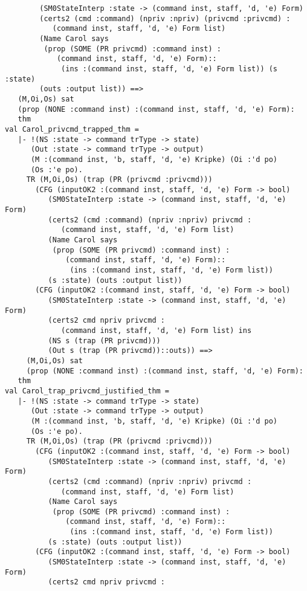 \documentclass{report}
\begin{document}
\begin{session}
\begin{scriptsize}
\begin{verbatim}
        (SM0StateInterp :state -> (command inst, staff, 'd, 'e) Form)
        (certs2 (cmd :command) (npriv :npriv) (privcmd :privcmd) :
           (command inst, staff, 'd, 'e) Form list)
        (Name Carol says
         (prop (SOME (PR privcmd) :command inst) :
            (command inst, staff, 'd, 'e) Form)::
             (ins :(command inst, staff, 'd, 'e) Form list)) (s :state)
        (outs :output list)) ==>
   (M,Oi,Os) sat
   (prop (NONE :command inst) :(command inst, staff, 'd, 'e) Form):
   thm
val Carol_privcmd_trapped_thm =
   |- !(NS :state -> command trType -> state)
      (Out :state -> command trType -> output)
      (M :(command inst, 'b, staff, 'd, 'e) Kripke) (Oi :'d po)
      (Os :'e po).
     TR (M,Oi,Os) (trap (PR (privcmd :privcmd)))
       (CFG (inputOK2 :(command inst, staff, 'd, 'e) Form -> bool)
          (SM0StateInterp :state -> (command inst, staff, 'd, 'e) Form)
          (certs2 (cmd :command) (npriv :npriv) privcmd :
             (command inst, staff, 'd, 'e) Form list)
          (Name Carol says
           (prop (SOME (PR privcmd) :command inst) :
              (command inst, staff, 'd, 'e) Form)::
               (ins :(command inst, staff, 'd, 'e) Form list))
          (s :state) (outs :output list))
       (CFG (inputOK2 :(command inst, staff, 'd, 'e) Form -> bool)
          (SM0StateInterp :state -> (command inst, staff, 'd, 'e) Form)
          (certs2 cmd npriv privcmd :
             (command inst, staff, 'd, 'e) Form list) ins
          (NS s (trap (PR privcmd)))
          (Out s (trap (PR privcmd))::outs)) ==>
     (M,Oi,Os) sat
     (prop (NONE :command inst) :(command inst, staff, 'd, 'e) Form):
   thm
val Carol_trap_privcmd_justified_thm =
   |- !(NS :state -> command trType -> state)
      (Out :state -> command trType -> output)
      (M :(command inst, 'b, staff, 'd, 'e) Kripke) (Oi :'d po)
      (Os :'e po).
     TR (M,Oi,Os) (trap (PR (privcmd :privcmd)))
       (CFG (inputOK2 :(command inst, staff, 'd, 'e) Form -> bool)
          (SM0StateInterp :state -> (command inst, staff, 'd, 'e) Form)
          (certs2 (cmd :command) (npriv :npriv) privcmd :
             (command inst, staff, 'd, 'e) Form list)
          (Name Carol says
           (prop (SOME (PR privcmd) :command inst) :
              (command inst, staff, 'd, 'e) Form)::
               (ins :(command inst, staff, 'd, 'e) Form list))
          (s :state) (outs :output list))
       (CFG (inputOK2 :(command inst, staff, 'd, 'e) Form -> bool)
          (SM0StateInterp :state -> (command inst, staff, 'd, 'e) Form)
          (certs2 cmd npriv privcmd :

\end{verbatim}
\end{scriptsize}
\end{session}
\end{document}
